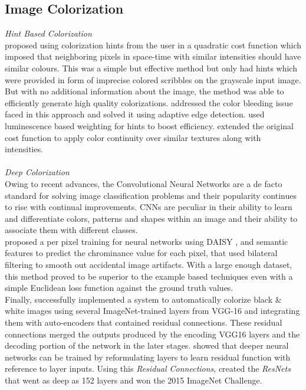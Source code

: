 \documentclass[conference]{IEEEtran}
\begin{document}
\subsection{Image Colorization}
\textit{Hint Based Colorization}\\
\hspace*{0.25 in}\citet{levin2004colorization} proposed using colorization hints from the user in a quadratic cost function which imposed that neighboring pixels in space-time with similar intensities should have similar colours. This was a simple but effective method but only had hints which were provided in form of imprecise colored scribbles on the grayscale input image. But with no additional information about the image, the method was able to efficiently generate high quality colorizations. \cite{huang2005edge} addressed the color bleeding issue faced in this approach and solved it using adaptive edge detection. \cite{yatziv2006chrominance} used luminescence based weighting for hints to boost efficiency. \cite{qu2006manga} extended the original cost function to apply color continuity over similar textures along with intensities.\\ \\
\hspace*{0.1 in}\textit{Deep Colorization}\\
\hspace*{0.25 in}Owing to recent advances, the Convolutional Neural Networks are a de facto standard for solving image classification problems and their popularity continues to rise with continual improvements. CNNs are peculiar in their ability to learn and differentiate colors, patterns and shapes within an image and their ability to associate them with different classes.\\
\hspace*{0.25 in}\cite{cheng2016deep} proposed a per pixel training for neural networks using DAISY \citep{tola2008descriptor}, and semantic \citep{long2015semantic} features to predict the chrominance value for each pixel, that used bilateral filtering to smooth out accidental image artifacts. With a large enough dataset, this method proved to be superior to the example based techniques even with a simple Euclidean loss function against the ground truth values.\\
\hspace*{0.25 in}Finally, \cite{dahl2016automatic} successfully implemented a system to automatically colorize black \& white images using several ImageNet-trained layers from VGG-16 \citep{simonyan2015deep} and integrating them with auto-encoders that contained residual connections. These residual connections merged the outputs produced by the encoding VGG16 layers and the decoding portion of the network in the later stages. \cite{he2015deep} showed that deeper neural networks can be trained by reformulating layers to learn residual function with reference to layer inputs. Using this \textit{Residual Connections}, \cite{he2015deep} created the \textit{ResNets} that went as deep as 152 layers and won the 2015 ImageNet Challenge.\\ \\
\end{document}
